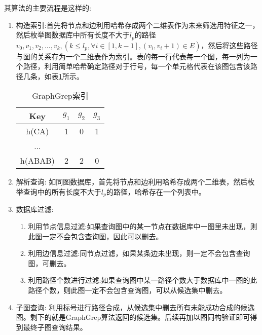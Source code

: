 \documentclass{XDBAthesis}
\begin{document}
其算法的主要流程是这样的:
\begin{enumerate}
    \item 构造索引:首先将节点和边利用哈希存成两个二维表作为未来筛选用特征之一，然后枚举图数据库中所有长度不大于$l_p $的路径$v_0 ,v_1 ,v_2 ,...,v_k ,( k\leq l_p ,\forall i\in [1,k-1],(v_i ,v_i+1)\in E) $，然后将这些路径与图的关系存为一个二维表作为索引。表的每一行代表每一个图，每一列为一个路径，利用简单哈希确定路径对于行号，每一个单元格代表在该图包含该路径几条，如表\ref{tb:grepIndex}所示。

\begin{table}[htb]
    \centering
    \begin{tabular}{|c|c|c|c|}
        \hline
        Key&$g_1 $&$g_2 $&$g_3 $ \\ \hline
        h(CA)&1&0&1 \\ \hline
        ...&&&\\ \hline
        h(ABAB)&2&2&0 \\
        \hline
    \end{tabular}
    \caption{GraphGrep索引}
    \label{tb:grepIndex}
\end{table}

    \item 解析查询: 如同图数据库，首先将节点和边利用哈希存成两个二维表，然后枚举查询中的所有长度不大于$l_p $的路径，哈希存在一个列表中。
    \item 数据库过滤: 
        \begin{enumerate}
            \item 利用节点信息过滤:如果查询图中的某一节点在数据库中一图里未出现，则此图一定不会包含查询图，因此可以删去。
            \item 利用边信息过滤:同节点过滤，如果某条边未出现，则一定不会包含查询图，可删去。
            \item 利用路径个数进行过滤:如果查询图中某一路径个数大于数据库中一图的此路径个数，则此图一定不会包含查询图，可以从候选集中删去。
        \end{enumerate}
    \item 子图查询: 利用标号进行路径合成，从候选集中删去所有未能成功合成的候选图。剩下的就是GraphGrep算法返回的候选集。后续再加以图同构验证即可得到最终子图查询结果。
    
\end{enumerate}






\ifx\allfiles\undefined


\end{document}
